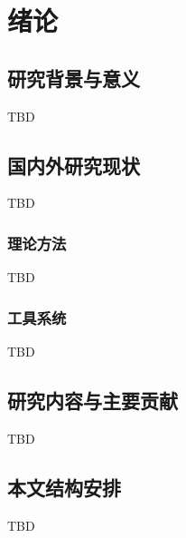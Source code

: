 
\chapter{绪论}


%
\section{研究背景与意义}

TBD

%
\section{国内外研究现状}

TBD

\subsection{理论方法}

TBD

\subsection{工具系统}

TBD


%
\section{研究内容与主要贡献}

TBD


%
\section{本文结构安排}

TBD
